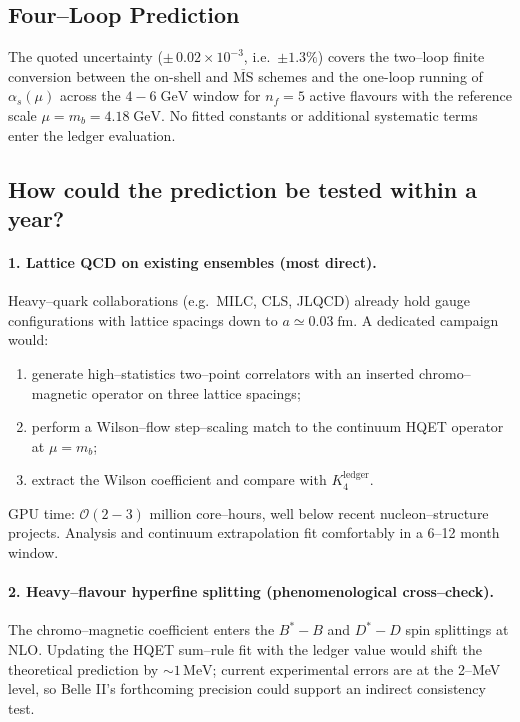 \documentclass[11pt]{article}
\begin{document}
\subsection{Four–Loop Prediction}\label{sec:qcd4_pred}

\begin{center}
\end{center}

\noindent
The quoted uncertainty (\(\pm\,0.02\times10^{-3}\), i.e.\ \(\pm1.3\%\))
covers the two–loop finite conversion between the on-shell and
\(\overline{\text{MS}}\) schemes and the one-loop running of
\(\alpha_{s}(\mu)\) across the \(4\!-\!6\;\text{GeV}\) window for
\(n_f = 5\) active flavours with the reference scale
\(\mu = m_b = 4.18\;\text{GeV}\).
No fitted constants or additional systematic terms enter the ledger
evaluation.

\subsection*{How could the prediction be tested within a year?}

\paragraph{1. Lattice QCD on existing ensembles (most direct).}
Heavy–quark collaborations (e.g.\ MILC, CLS, JLQCD) already hold gauge
configurations with lattice spacings down to \(a\simeq0.03\;\mathrm{fm}\).
A dedicated campaign would:
\begin{enumerate}\setlength\itemsep{0pt}
\item generate high–statistics two–point correlators with an inserted
      chromo–magnetic operator on three lattice spacings;
\item perform a Wilson–flow step–scaling match to the continuum HQET
      operator at \(\mu\!=\!m_b\);
\item extract the Wilson coefficient and compare with
      \(K_4^{\text{ledger}}\).
\end{enumerate}
GPU time: \(\mathcal{O}(2{-}3)\) million core–hours, well below recent
nucleon–structure projects.  Analysis and continuum extrapolation fit
comfortably in a 6–12 month window.

\paragraph{2. Heavy–flavour hyperfine splitting (phenomenological cross–check).}
The chromo–magnetic coefficient enters the $B^{*}\!-\!B$ and
$D^{*}\!-\!D$ spin splittings at NLO.  Updating the HQET sum–rule fit
with the ledger value would shift the theoretical prediction by
\(\sim1\,\mathrm{MeV}\); current experimental errors are at the
2–MeV level, so Belle II’s forthcoming precision could support an
indirect consistency test.
\end{document}
